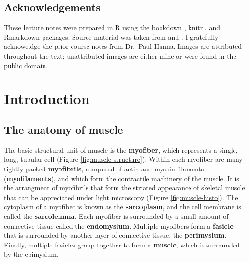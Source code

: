 \documentclass[openany]{report}
\begin{document}
\section*{Acknowledgements}\label{acknowledgements}

These lecture notes were prepared in R \citep{R-base} using the bookdown
\citep{xie2015}, knitr \citep{R-knitr}, and Rmarkdown
\citep{R-rmarkdown} packages. Source material was taken from
\citet{zachary2016pathologic} and \citet{maxie2015jubb}. I gratefully
acknoweldge the prior course notes from Dr.~Paul Hanna. Images are
attributed throughout the text; unattributed images are either mine or
were found in the public domain.

\chapter{Introduction}\label{intro}

\hypertarget{the-anatomy-of-muscle}{\section{The anatomy of
muscle}\label{the-anatomy-of-muscle}}

The basic structural unit of muscle is the \textbf{myofiber}, which
represents a single, long, tubular cell (Figure
\ref{fig:muscle-structure}). Within each myofiber are many tightly
packed \textbf{myofibrils}, composed of actin and myosin filaments
(\textbf{myofilaments}), and which form the contractile machinery of the
muscle. It is the arrangment of myofibrils that form the striated
appearance of skeletal muscle that can be appreciated under light
microscopy (Figure \ref{fig:muscle-histo}). The cytoplasm of a myofiber
is known as the \textbf{sarcoplasm}, and the cell membrane is called the
\textbf{sarcolemma}. Each myofiber is surrounded by a small amount of
connective tissue called the \textbf{endomysium}. Multiple myofibers
form a \textbf{fasicle} that is surrounded by another layer of
connective tissue, the \textbf{perimysium}. Finally, multiple fasicles
group together to form a \textbf{muscle}, which is surrounded by the
epimysium.
\end{document}
